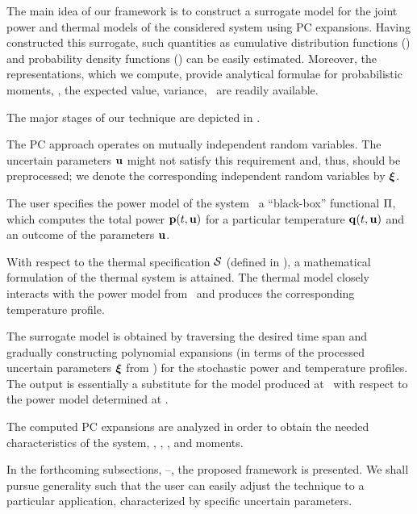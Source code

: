 The main idea of our framework is to construct a surrogate model for the joint power and thermal models of the considered system using PC expansions.
Having constructed this surrogate, such quantities as cumulative distribution functions (\cdfs) and probability density functions (\pdfs) can be easily estimated.
Moreover, the representations, which we compute, provide analytical formulae for probabilistic moments, \ie, the expected value, variance, \etc\ are readily available.

The major stages of our technique are depicted in .

The PC approach operates on mutually independent random variables. The uncertain parameters $\mathbf{u}$ might not satisfy this requirement and, thus, should be preprocessed; we denote the corresponding independent random variables by $\boldsymbol{\xi}$.

The user specifies the power model of the system \via\ a ``black-box'' functional $\oPower$, which computes the total power $\mathbf{p}(t, \mathbf{u})$ for a particular temperature $\mathbf{q}(t, \mathbf{u})$ and an outcome of the parameters $\mathbf{u}$.

With respect to the thermal specification $\mathcal{S}$ (defined in ), a mathematical formulation of the thermal system is attained.
The thermal model closely interacts with the power model from \ and produces the corresponding temperature profile.

The surrogate model is obtained by traversing the desired time span and gradually constructing polynomial expansions (in terms of the processed uncertain parameters $\boldsymbol{\xi}$ from ) for the stochastic power and temperature profiles.
The output is essentially a substitute for the model produced at \ with respect to the power model determined at .

The computed PC expansions are analyzed in order to obtain the needed characteristics of the system, \eg, \cdfs, \pdfs, and moments.

In the forthcoming subsections, --, the proposed framework is presented.
We shall pursue generality such that the user can easily adjust the technique to a particular application, characterized by specific uncertain parameters.

